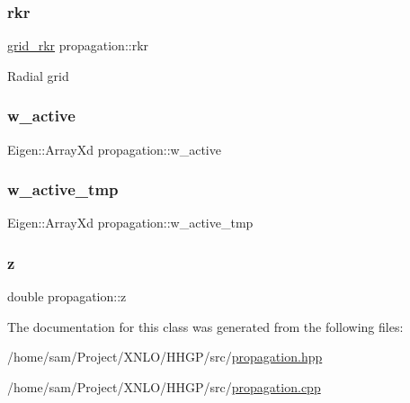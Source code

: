 \mbox{\label{classpropagation_a3d37531bb5918f972544d242aec7e72b}} 
\subsubsection{\texorpdfstring{rkr}{rkr}}
{\footnotesize\ttfamily \hyperlink{classgrid__rkr}{grid\+\_\+rkr} propagation\+::rkr\hspace{0.3cm}{\ttfamily [private]}}

Radial grid \mbox{\label{classpropagation_a4c24f42d4148eded469c6479d6bf1661}} 
\subsubsection{\texorpdfstring{w\+\_\+active}{w\_active}}
{\footnotesize\ttfamily Eigen\+::\+Array\+Xd propagation\+::w\+\_\+active}

\mbox{\label{classpropagation_a07a80b67a345e3e9d8e934d2265ba288}} 
\subsubsection{\texorpdfstring{w\+\_\+active\+\_\+tmp}{w\_active\_tmp}}
{\footnotesize\ttfamily Eigen\+::\+Array\+Xd propagation\+::w\+\_\+active\+\_\+tmp\hspace{0.3cm}{\ttfamily [private]}}

\mbox{\label{classpropagation_aeacfc091fafd1fdb1af4536f6f587e55}} 
\subsubsection{\texorpdfstring{z}{z}}
{\footnotesize\ttfamily double propagation\+::z}



The documentation for this class was generated from the following files\+:\begin{DoxyCompactItemize}
\item 
/home/sam/\+Project/\+X\+N\+L\+O/\+H\+H\+G\+P/src/\hyperlink{propagation_8hpp}{propagation.\+hpp}\item 
/home/sam/\+Project/\+X\+N\+L\+O/\+H\+H\+G\+P/src/\hyperlink{propagation_8cpp}{propagation.\+cpp}\end{DoxyCompactItemize}
